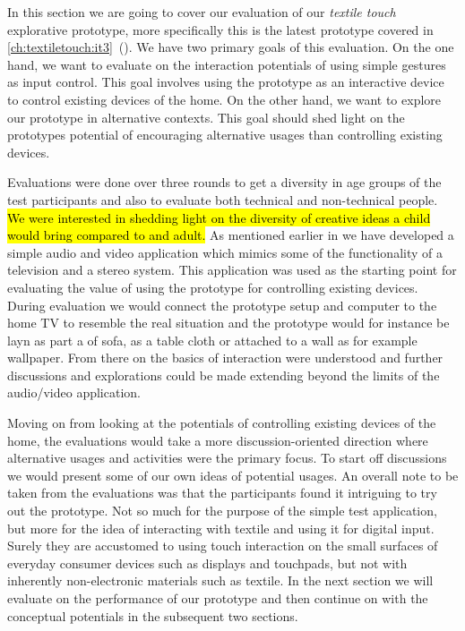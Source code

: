 In this section we are going to cover our evaluation of our \emph{textile touch} explorative prototype, more specifically this is the latest prototype covered in \ref{ch:textiletouch:it3}~().
We have two primary goals of this evaluation.
On the one hand, we want to evaluate on the interaction potentials of using simple gestures as input control.
This goal involves using the prototype as an interactive device to control existing devices of the home.
On the other hand, we want to explore our prototype in alternative contexts.
This goal should shed light on the prototypes potential of encouraging alternative usages than controlling existing devices.

Evaluations were done over three rounds to get a diversity in age groups of the test participants and also to evaluate both technical and non-technical people.
\hl{We were interested in shedding light on the diversity of creative ideas a child would bring compared to and adult.
}
\blank
As mentioned earlier in \emph{  } we have developed a simple audio and video application which mimics some of the functionality of a television and a stereo system.
This application was used as the starting point for evaluating the value of using the prototype for controlling existing devices.
During evaluation we would connect the prototype setup and computer to the home TV to resemble the real situation and the prototype would for instance be layn as part a of sofa, as a table cloth or attached to a wall as for example wallpaper.
From there on the basics of interaction were understood and further discussions and explorations could be made extending beyond the limits of the audio/video application.

Moving on from looking at the potentials of controlling existing devices of the home, the evaluations would take a more discussion-oriented direction where alternative usages and activities were the primary focus.
To start off discussions we would present some of our own ideas of potential usages.
\blank
An overall note to be taken from the evaluations was that the participants found it intriguing to try out the prototype.
Not so much for the purpose of the simple test application, but more for the idea of interacting with textile and using it for digital input.
Surely they are accustomed to using touch interaction on the small surfaces of everyday consumer devices such as displays and touchpads, but not with inherently non-electronic materials such as textile. 
\blank
In the next section we will evaluate on the performance of our prototype and then continue on with the conceptual potentials in the subsequent two sections.

